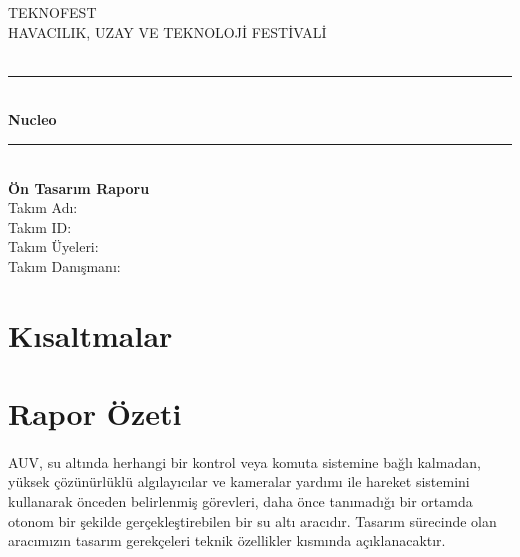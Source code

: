 \documentclass[12pt]{article}
\begin{document}
\begin{titlepage}

\newcommand{\HRule}{\rule{\linewidth}{0.5mm}}

\center

\textsc{\LARGE TEKNOFEST}\\[1.0cm]
\textsc{\large HAVACILIK, UZAY VE TEKNOLOJİ FESTİVALİ}\\[1.0cm]
\\[1.0cm]
\HRule \\[0.4cm]
{\huge \bfseries Nucleo}\\[0.3cm]
\HRule \\[1.0cm]
{\large \bfseries Ön Tasarım Raporu}\\[2cm]
{\large Takım Adı:}\\[1cm]
{\large Takım ID:}\\[1cm]
{\large Takım Üyeleri:}\\[1cm]
{\large Takım Danışmanı:}\\[1cm]

\vfill
\end{titlepage}

\tableofcontents

\newpage
{}
\section*{Kısaltmalar}


\newpage

\section{Rapor Özeti}

\begin{justify}
\justify
\paragraph{} AUV, su altında herhangi bir kontrol veya komuta sistemine bağlı kalmadan, yüksek çözünürlüklü algılayıcılar ve kameralar yardımı ile hareket sistemini kullanarak önceden belirlenmiş görevleri, daha önce tanımadığı bir ortamda otonom bir şekilde gerçekleştirebilen bir su altı aracıdır. Tasarım sürecinde olan aracımızın tasarım gerekçeleri teknik özellikler kısmında açıklanacaktır.
\end{justify}
\end{document}
